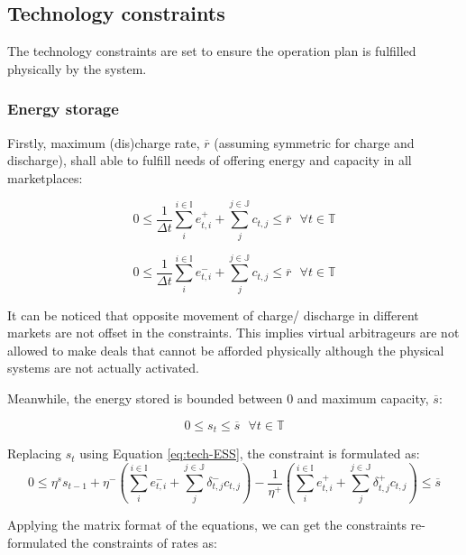 \subsection{Technology constraints}
\label{sec:tech-constraints}
The technology constraints are set to ensure the operation plan is fulfilled physically by the system.

\subsubsection{Energy storage}
Firstly, maximum (dis)charge rate, $\overline{r}$ (assuming symmetric for charge and discharge), shall able to fulfill needs of offering energy and capacity in all marketplaces:

\begin{equation*}
0 \leq \frac{1}{\Delta t}\sum_{i}^{i \in \mathbb{I}} e^{+}_{t,i} + \sum_{j}^{j \in \mathbb{J}} c_{t,j} \leq \overline{r}~~~ \forall t \in \mathbb{T}
\end{equation*}

\begin{equation*}
0 \leq \frac{1}{\Delta t}\sum_{i}^{i \in \mathbb{I}} e^{-}_{t,i} + \sum_{j}^{j \in \mathbb{J}} c_{t,j} \leq \overline{r}~~~ \forall t \in \mathbb{T}
\end{equation*}

It can be noticed that opposite movement of charge/ discharge in different markets are not offset in the constraints. This implies virtual arbitrageurs are not allowed to make deals that cannot be afforded physically although the physical systems are not actually activated.

Meanwhile, the energy stored is bounded between 0 and maximum capacity, $\overline{s}$:

\begin{equation*}
0 \leq s_t \leq \overline{s}~~~ \forall t \in \mathbb{T}
\end{equation*}

Replacing $s_t$ using Equation \eqref{eq:tech-ESS}, the constraint is formulated as:
\begin{equation*}
0 \leq \eta^s s_{t-1} + \eta^- \left(\sum_{i}^{i \in \mathbb{I}} e^{-}_{t,i}  + \sum_{j}^{j \in \mathbb{J}} \delta_{t,j}^- c_{t,j}\right)- \frac{1}{\eta^+} \left( \sum_{i}^{i \in \mathbb{I}} e^{+}_{t,i} +\sum_{j}^{j \in \mathbb{J}} \delta_{t,j}^{+}c_{t,j}\right) \leq \overline{s}
\end{equation*}

Applying the matrix format of the equations, we can get the constraints re-formulated the constraints of rates as:

